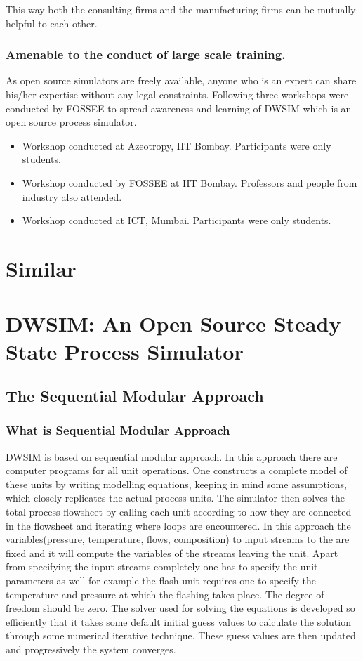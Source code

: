 \documentclass[12pt]{report}
\begin{document}
This way both the consulting firms and the manufacturing firms can be mutually helpful to each other.

\subsection{Amenable to the conduct of large scale training.}
As open source simulators are freely available, anyone who is an expert can share his/her expertise without any legal constraints. Following three workshops were conducted by FOSSEE to spread awareness and learning of DWSIM which is an open source process simulator.
\begin{itemize}
\item{Workshop conducted at Azeotropy, IIT Bombay. Participants were only students.}
\item{Workshop conducted by FOSSEE at IIT Bombay. Professors and people from industry also attended.}
\item{Workshop conducted at ICT, Mumbai. Participants were only students.}
\end{itemize}

\chapter{Similar}


\chapter{DWSIM: An Open Source Steady State Process Simulator}

\section{The Sequential Modular Approach}
\subsection{What is Sequential Modular Approach}
DWSIM is based on sequential modular approach. In this approach there are computer programs for all unit operations. One constructs a complete model of these units by writing modelling equations, keeping in mind some assumptions, which closely replicates the actual process units. The simulator then solves the total process flowsheet by calling each unit according to how they are connected in the flowsheet and iterating where loops are encountered. In this approach the variables(pressure, temperature, flows, composition) to input streams to the are fixed and it will compute the variables of the streams leaving the unit. Apart from specifying the input streams completely one has to specify the unit parameters as well for example the flash unit requires one to specify the temperature and pressure at which the flashing takes place. The degree of freedom should be zero. The solver used for solving the equations is developed so efficiently that it takes some default initial guess values to calculate the solution through some numerical iterative technique. These guess values are then updated and progressively the system converges.
\end{document}
